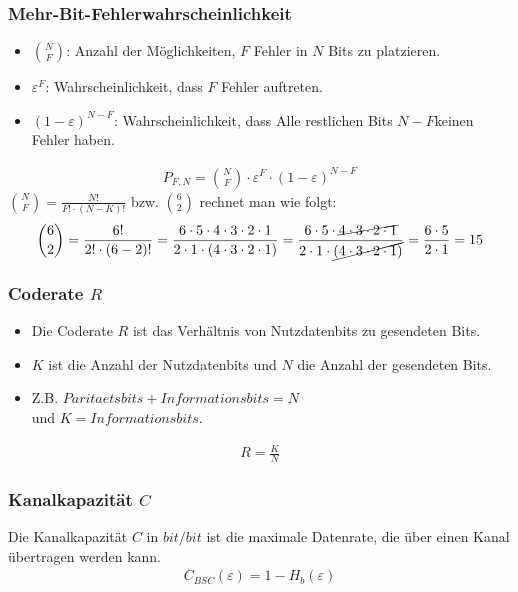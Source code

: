 \subsubsection{Mehr-Bit-Fehlerwahrscheinlichkeit}
\begin{itemize}
    \item $\binom{N}{F}$: Anzahl der Möglichkeiten, $F$ Fehler in $N$ Bits zu platzieren.
    \item $\varepsilon^F$: Wahrscheinlichkeit, dass $F$ Fehler auftreten.
    \item $(1 - \varepsilon)^{N-F}$: Wahrscheinlichkeit, dass Alle restlichen Bits $N-F$keinen Fehler haben.
\end{itemize}
\begin{align*}
    P_{F,N} = \binom{N}{F} \cdot \varepsilon^F \cdot (1 - \varepsilon)^{N-F}
\end{align*}
$\binom{N}{F} = \frac{N!}{F! \cdot (N-K)!}$ bzw. $\binom{6}{2}$ rechnet man wie folgt:
\begin{align*}
    \binom{6}{2} = \frac{6!}{2! \cdot (6-2)!} = \frac{6 \cdot 5 \cdot 4 \cdot 3 \cdot 2 \cdot 1}{2 \cdot 1 \cdot (4 \cdot 3 \cdot 2 \cdot 1)} 
    = \frac{6 \cdot 5 \cdot \cancel{4 \cdot 3 \cdot 2 \cdot 1}}{2 \cdot 1 \cdot \cancel{(4 \cdot 3 \cdot 2 \cdot 1)}}  = \frac{6 \cdot 5}{2 \cdot 1} = 15
\end{align*}
\subsubsection{Coderate $R$}
\begin{itemize}
    \item Die Coderate $R$ ist das Verhältnis von Nutzdatenbits zu gesendeten Bits.
    \item $K$ ist die Anzahl der Nutzdatenbits und $N$ die Anzahl der gesendeten Bits.
    \item Z.B. $Paritaetsbits + Informationsbits = N$\\ und $K = Informationsbits$.
\end{itemize}
\begin{align*}
    R = \frac{K}{N}
\end{align*}
\subsubsection{Kanalkapazität $C$}
Die Kanalkapazität $C$ in $bit/bit$ ist die maximale Datenrate, die über einen Kanal übertragen werden kann.
\begin{align*}
    C_{BSC}(\varepsilon) = 1 - H_b(\varepsilon)
\end{align*}
